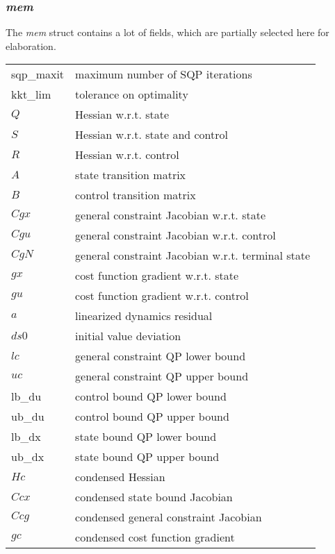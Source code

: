 \documentclass{article}
\newcommand{\alert}[1]{{\textit{#1}}}
\begin{document}
\subsubsection{\alert{mem}}
The \alert{mem} struct contains a lot of fields, which are partially selected here for elaboration.
\begin{longtable}{l|l}
		\hline
		sqp\_maxit & maximum number of SQP iterations          \\
		kkt\_lim   & tolerance on optimality                   \\ \hline
	    $Q$	& Hessian w.r.t. state                      \\
		$S$	& Hessian w.r.t. state and control          \\
		$R$	& Hessian w.r.t. control                    \\
		$A$	& state transition matrix                   \\
		$B$	& control transition matrix                 \\
		$Cgx$	& general constraint Jacobian w.r.t. state          \\
		$Cgu$	& general constraint Jacobian w.r.t. control        \\
		$CgN$	& general constraint Jacobian w.r.t. terminal state \\
		$gx$	& cost function gradient w.r.t. state       \\
		$gu$	& cost function gradient w.r.t. control     \\
		$a$	& linearized dynamics residual              \\
		$ds0$	& initial value deviation                   \\
		$lc$	& general constraint QP lower bound         \\
		$uc$	& general constraint QP upper bound         \\
	    lb\_du	& control bound QP lower bound              \\
		ub\_du	& control bound QP upper bound              \\
		lb\_dx	& state bound QP lower bound                \\
		ub\_dx & state bound QP upper bound                \\\hline
		$Hc$ & condensed Hessian                         \\
		$Ccx$ & condensed state bound Jacobian            \\
		$Ccg$ & condensed general constraint Jacobian     \\
		$gc$ & condensed cost function gradient          \\

\end{longtable}
\end{document}
